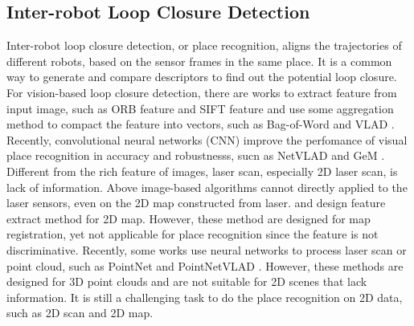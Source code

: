 \label{sec:relatedwork}

\subsection{Inter-robot Loop Closure Detection}
Inter-robot loop closure detection, or place recognition, aligns the trajectories of different robots, based on the sensor frames in the same place. 
It is a common way to generate and compare descriptors to find out the potential loop closure.
For vision-based loop closure detection, there are works to extract feature from input image, such as ORB feature\cite{Mur-Artal:2017281} and SIFT feature \cite{lowe2004distinctive} and use some aggregation method to compact the feature into vectors, such as Bag-of-Word \cite{jegou2011aggregating} and VLAD \cite{tolias2013aggregate}.
Recently, convolutional neural networks (CNN) improve the perfomance of visual place recognition in accuracy and robustnesss, sucn as NetVLAD \cite{arandjelovic2016netvlad} and GeM \cite{radenovic2018fine}.
Different from the rich feature of images, laser scan, especially 2D laser scan, is lack of information. Above image-based algorithms cannot directly applied to the laser sensors, even on the  2D map constructed from laser.
\cite{ribenren1} and \cite{ribenren2} design feature extract method for 2D map. 
However, these method are designed for map registration, yet not applicable for place recognition since the feature is not discriminative.
Recently, some works use neural networks to process laser scan or point cloud, such as PointNet \cite{qi2017pointnet} and PointNetVLAD \cite{angelina2018pointnetvlad}. However, these methods are designed for 3D point clouds and are not suitable for 2D scenes that lack information.
It is still a challenging task to do the place recognition on 2D data, such as 2D scan and 2D map.

